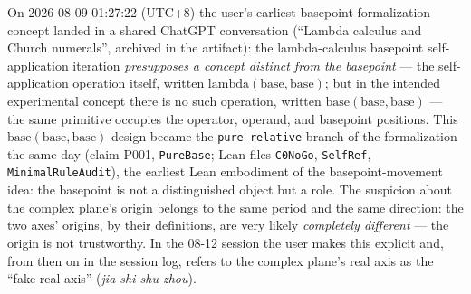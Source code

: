 \documentclass[sigplan,10pt,anonymous,review]{acmart}
\begin{document}
On 2026-08-09 01:27:22 (UTC+8) the user's earliest basepoint-formalization
concept landed in a shared ChatGPT conversation (``Lambda calculus and
Church numerals'', archived in the artifact): the lambda-calculus
basepoint self-application iteration \emph{presupposes a concept distinct
from the basepoint} --- the self-application operation itself, written
$\mathrm{lambda}(\mathrm{base},\mathrm{base})$; but in the intended
experimental concept there is no such operation, written
$\mathrm{base}(\mathrm{base},\mathrm{base})$ --- the same primitive
occupies the operator, operand, and basepoint positions. This
$\mathrm{base}(\mathrm{base},\mathrm{base})$ design became the
\texttt{pure-relative} branch of the formalization the same day (claim
P001, \texttt{PureBase}; Lean files \texttt{C0NoGo}, \texttt{SelfRef},
\texttt{MinimalRuleAudit}), the earliest Lean embodiment of the
basepoint-movement idea: the basepoint is not a distinguished object but a
role. The suspicion about the complex plane's
origin belongs to the same period and the same direction: the two axes'
origins, by their definitions, are very likely \emph{completely different}
--- the origin is not trustworthy. In the 08-12 session the user makes this
explicit and, from then on in the session log, refers to the complex
plane's real axis as the ``fake real axis'' (\emph{jia shi shu zhou}).
\end{document}
